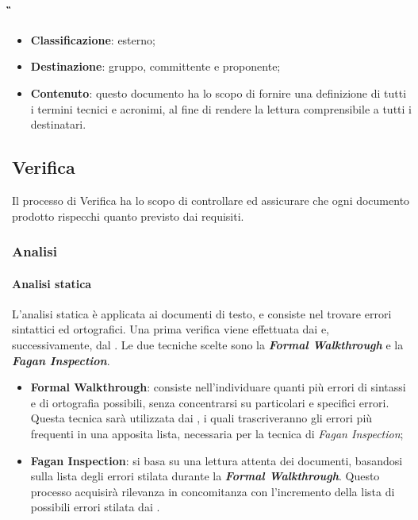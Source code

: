 			\paragraph{\G}
			\begin{itemize}
				\item \textbf{Classificazione}: esterno;
				\item \textbf{Destinazione}: gruppo, committente e proponente;
				\item \textbf{Contenuto}: questo documento ha lo scopo di fornire una definizione di tutti i termini tecnici e acronimi, al fine di rendere la lettura comprensibile a tutti i destinatari.
			\end{itemize}

	\subsection{Verifica}
	Il processo di Verifica ha lo scopo di controllare ed assicurare che ogni documento prodotto rispecchi quanto previsto dai requisiti.

		\subsubsection{Analisi}

			\paragraph{Analisi statica}
			L'analisi statica è applicata ai documenti di testo, e consiste nel trovare errori sintattici ed ortografici. Una prima verifica viene effettuata dai \textit{\Vers} e, successivamente, dal \textit{\RdP}. Le due tecniche scelte sono la \textbf{\textit{Formal Walkthrough}} e la \textbf{\textit{Fagan Inspection}}.
			\begin{itemize}
				\item \textbf{Formal Walkthrough}: consiste nell'individuare quanti più errori di sintassi e di ortografia possibili, senza concentrarsi su particolari e specifici errori. Questa tecnica sarà utilizzata dai \textit{\Vers}, i quali trascriveranno gli errori più frequenti in una apposita lista, necessaria per la tecnica di \textit{Fagan Inspection};
				\item \textbf{Fagan Inspection}: si basa su una lettura attenta dei documenti, basandosi sulla lista degli errori stilata durante la \textbf{\textit{Formal Walkthrough}}. Questo processo acquisirà rilevanza in concomitanza con l'incremento della lista di possibili errori stilata dai \textit{\Vers}.
			\end{itemize}

